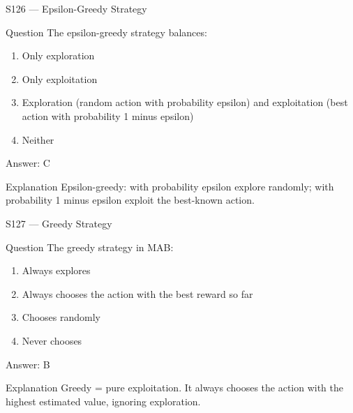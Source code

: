 \documentclass[aspectratio=169,8pt]{beamer}
\begin{document}
	\begin{frame}{S126 --- Epsilon-Greedy Strategy}
		\begin{block}{Question}
			The epsilon-greedy strategy balances:
			\begin{enumerate}
				\item Only exploration
				\item Only exploitation
				\item Exploration (random action with probability epsilon) and exploitation (best action with probability 1 minus epsilon)
				\item Neither
			\end{enumerate}
		\end{block}
		\begin{exampleblock}{Answer: C}\end{exampleblock}
		\begin{block}{Explanation}
			Epsilon-greedy: with probability epsilon explore randomly; with probability 1 minus epsilon exploit the best-known action.
		\end{block}
	\end{frame}
	
	\begin{frame}{S127 --- Greedy Strategy}
		\begin{block}{Question}
			The greedy strategy in MAB:
			\begin{enumerate}
				\item Always explores
				\item Always chooses the action with the best reward so far
				\item Chooses randomly
				\item Never chooses
			\end{enumerate}
		\end{block}
		\begin{exampleblock}{Answer: B}\end{exampleblock}
		\begin{block}{Explanation}
			Greedy = pure exploitation. It always chooses the action with the highest estimated value, ignoring exploration.
		\end{block}
	\end{frame}
	
\end{document}

